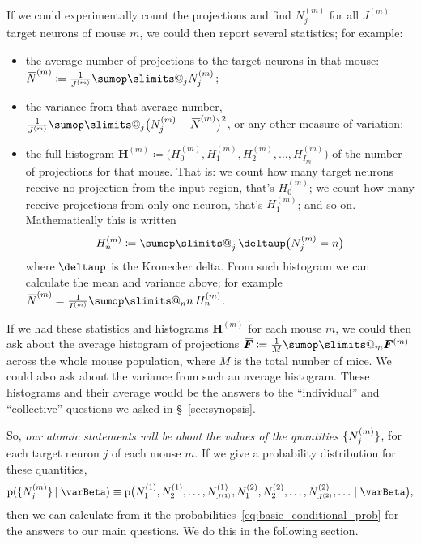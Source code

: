 \documentclass[\ifafour a4paper,12pt,\else a5paper,10pt,\fi%
onecolumn,oneside,article,%
british%
]{memoir}
\makeatletter
\theoremstyle{remark}
\theoremstyle{innote}
\def\sum{\DOTSI\sumop\slimits@}
\newcommand*{\delt}{\deltaup}%
\newcommand*{\defd}{\coloneqq}
\newcommand*{\pf}{\mathrm{p}}%
\renewcommand*{\|}[1][]{\nonscript\,#1\vert\nonscript\;\mathopen{}}
\newcommand*{\sect}{\S}%
\newcommand*{\tsum}{\mathop{\textstyle\sum}\nolimits}
\newcommand*{\widebar}[1]{{\mkern1.5mu\skew{2}\overline{\mkern-1.5mu#1\mkern-1.5mu}\mkern 1.5mu}}
\newcommand*{\yI}{\varBeta}
\newcommand*{\yNa}{\widebar{N}}
\newcommand*{\yF}{\bm{F}}
\newcommand*{\yFm}[1][m]{\yF^{(#1)}}
\newcommand*{\yH}{\bm{H}}
\newcommand*{\yHHm}[1][m]{H^{(#1)}}
\newcommand*{\yHm}[1][m]{\yH^{(#1)}}
\newcommand*{\yIm}[1][m]{I^{(#1)}}
\newcommand*{\yJm}[1][m]{J^{(#1)}}
\newcommand*{\yNm}[1][m]{N^{(#1)}}
\newcommand*{\yNma}[1][m]{\yNa^{(#1)}}
\newcommand*{\yFa}{\widebar{\yF}}
\DeclarePairedDelimiter\tu{\{}{\}}
\makeatother
\begin{document}
If we could experimentally count the projections and find $\yNm_{j}$ for all
$\yJm$ target neurons of mouse $m$,  we could then report several
statistics; for example:
\begin{itemize}[wide]
\item the average number of projections to the target neurons in that
  mouse: $\yNma \defd \frac{1}{\yJm}\sum_{j}\yNm_{j}$;
\item the variance from that average number,
  $\frac{1}{\yJm}\sum_{j}\bigl(\yNm_{j}-\yNma\bigr)^{2}$, or any other measure
  of variation;
\item the full histogram
  $\yHm\defd \bigl(\yHHm_{0},\yHHm_{1}, \yHHm_{2},\dotsc,
  \yHHm_{I_{m}}\bigr)$ of the number of projections for that mouse. That
  is: we count how many target neurons receive no projection from the input
  region, that's $\yHHm_{0}$; we count how many receive projections from
  only one neuron, that's $\yHHm_{1}$; and so on. Mathematically this is
  written
  \begin{equation}
    \label{eq:count_histogram}
    \yHHm_{n} \defd \tsum_{j} \delt\bigl(\yNm_{j} = n\bigr)
  \end{equation}
  where $\delt$ is the Kronecker delta.
  From such histogram we can calculate the mean and variance above; for
  example $\yNma = \frac{1}{\yIm}\sum_{n}n\,\yHHm_{n}$.
\end{itemize}

If we had these statistics and histograms $\yHm$ for each mouse $m$, we
could then ask about the average histogram of projections
$\yFa \defd \frac{1}{M}\sum_{m} \yFm$ across the whole mouse population,
where $M$ is the total number of mice. We could also ask about the variance
from such an average histogram. These histograms and their average would be
the answers to the \enquote{individual} and \enquote{collective} questions
we asked in \sect~\ref{sec:synopsis}.

So, \emph{our atomic statements will be about the values of the quantities
  $\tu{\yNm_{j}}$}, for each target neuron $j$ of each mouse $m$. If we give a
probability distribution for these quantities,
\begin{equation}
  \label{eq:guess_prob_N}
  \pf(\tu{\yNm_{j}} \| \yI)
  \equiv
  \pf\bigl(\yNm[1]_{1}, \yNm[1]_{2},  \dotsc, \yNm[1]_{\yJm[1]},
  \yNm[2]_{1}, \yNm[2]_{2},  \dotsc,\yNm[2]_{\yJm[2]}, \dotsc
  \|  \yI\bigr),
\end{equation}
then we can calculate from it the
probabilities~\eqref{eq:basic_conditional_prob} for the answers to our main
questions. We do this in the following section.
\end{document}
